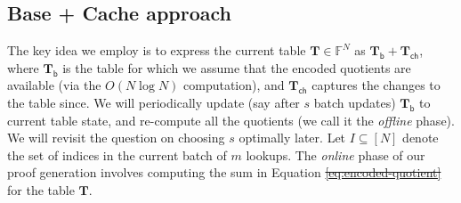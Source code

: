 \documentclass[sigconf]{acmart}
\renewcommand{\vec}{\mathbf} %
\newcommand{\vecT}{\vec{T}}
\newcommand{\vecTbase}{\vec{T}_{\mathsf{b}}}
\newcommand{\vecTcache}{\vec{T}_{\mathsf{ch}}}
\newcommand{\F}{\mathbb{F}}
\providecommand{\DIFaddtex}[1]{{\protect\color{blue}\uwave{#1}}} %
\providecommand{\DIFdeltex}[1]{{\protect\color{red}\sout{#1}}}                      %
\providecommand{\DIFaddbegin}{} %
\providecommand{\DIFaddend}{} %
\providecommand{\DIFdelbegin}{} %
\providecommand{\DIFdelend}{} %
\providecommand{\DIFadd}[1]{\texorpdfstring{\DIFaddtex{#1}}{#1}} %
\providecommand{\DIFdel}[1]{\texorpdfstring{\DIFdeltex{#1}}{}} %
\newcommand{\DIFscaledelfig}{0.5}
\newlength{\DIFdelgraphicswidth} %
\newlength{\DIFdelgraphicsheight} %
\newcommand{\DIFaddincludegraphics}[2][]{{\color{blue}\fbox{\DIFOincludegraphics[#1]{#2}}}} %
\newcommand{\DIFdelincludegraphics}[2][]{%
	\sbox{\DIFdelgraphicsbox}{\DIFOincludegraphics[#1]{#2}}%
	\settoboxwidth{\DIFdelgraphicswidth}{\DIFdelgraphicsbox} %
	\settoboxtotalheight{\DIFdelgraphicsheight}{\DIFdelgraphicsbox} %
	\scalebox{\DIFscaledelfig}{%
		\parbox[b]{\DIFdelgraphicswidth}{\usebox{\DIFdelgraphicsbox}\\[-\baselineskip] \rule{\DIFdelgraphicswidth}{0em}}\llap{\resizebox{\DIFdelgraphicswidth}{\DIFdelgraphicsheight}{%
				\setlength{\unitlength}{\DIFdelgraphicswidth}%
				\begin{picture}(1,1)%
					\thicklines\linethickness{2pt} %
					{\color[rgb]{1,0,0}\put(0,0){\framebox(1,1){}}}%
					{\color[rgb]{1,0,0}\put(0,0){\line( 1,1){1}}}%
					{\color[rgb]{1,0,0}\put(0,1){\line(1,-1){1}}}%
				\end{picture}%
			}\hspace*{3pt}}} %
} %
\DeclareRobustCommand{\DIFaddbegin}{\DIFOaddbegin \let\includegraphics\DIFaddincludegraphics} %
\DeclareRobustCommand{\DIFaddend}{\DIFOaddend \let\includegraphics\DIFOincludegraphics} %
\DeclareRobustCommand{\DIFdelbegin}{\DIFOdelbegin \let\includegraphics\DIFdelincludegraphics} %
\DeclareRobustCommand{\DIFdelend}{\DIFOaddend \let\includegraphics\DIFOincludegraphics} %
\begin{document}
	\subsection{Base + Cache approach}\label{subsec:base-cache}
	The key idea we employ is to express the current table $\vecT\in \F^N$ as $\vecTbase + \vecTcache$, where $\vecTbase$ is the table for which we assume that
	the encoded quotients are available (via the $O(N\log N)$ computation), and $\vecTcache$ captures the changes to the table since. We will periodically update (say
	after $s$ batch updates) $\vecTbase$ to current table state, and re-compute all the quotients (we call it the {\em offline} phase).
	We will revisit the question on choosing $s$ optimally later. Let $I\subseteq [N]$ denote the set of indices in the current batch of $m$ lookups. The {\em online}
	phase of our proof generation involves computing the sum in Equation \DIFdelbegin \DIFdel{\eqref{eq:encoded-quotient} }\DIFdelend \DIFaddbegin \DIFadd{\eqref{eq:enc-quotient} }\DIFaddend for the table $\vecT$.
	\DIFdelbegin %
\end{document}
